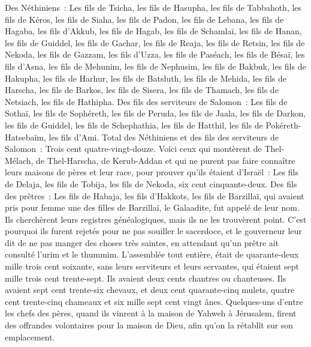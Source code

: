 \begin{multicols}{2}
Des Néthiniens~: Les fils de Tsicha, les fils de Hasupha, les fils de Tabbahoth,
les fils de Kéros, les fils de Siaha, les fils de Padon,
les fils de Lebana, les fils de Hagaba, les fils d'Akkub,
les fils de Hagab, les fils de Schamlaï, les fils de Hanan,
les fils de Guiddel, les fils de Gachar, les fils de Reaja,
les fils de Retsin, les fils de Nekoda, les fils de Gazzam,
les fils d'Uzza, les fils de Paséach, les fils de Bésaï,
les fils d'Asna, les fils de Mehunim, les fils de Nephusim,
les fils de Bakbuk, les fils de Hakupha, les fils de Harhur,
les fils de Batsluth, les fils de Mehida, les fils de Harscha,
les fils de Barkos, les fils de Sisera, les fils de Thamach,
les fils de Netsiach, les fils de Hathipha.
Des fils des serviteurs de Salomon~: Les fils de Sothaï, les fils de Sophéreth, les fils de Peruda,
les fils de Jaala, les fils de Darkon, les fils de Guiddel,
les fils de Schephathia, les fils de Hatthil, les fils de Pokéreth-Hatsebaïm, les fils d'Ami.
Total des Néthiniens et des fils des serviteurs de Salomon~: Trois cent quatre-vingt-douze.
Voici ceux qui montèrent de Thel-Mélach, de Thel-Harscha, de Kerub-Addan et qui ne purent pas faire connaître leurs maisons de pères et leur race, pour prouver qu'ils étaient d'Israël~:
Les fils de Delaja, les fils de Tobija, les fils de Nekoda, six cent cinquante-deux.
Des fils des prêtres~: Les fils de Habaja, les fils d'Hakkots, les fils de Barzillaï, qui avaient pris pour femme une des filles de Barzillaï, le Galaadite, fut appelé de leur nom.
Ils cherchèrent leurs registres généalogiques, mais ils ne les trouvèrent point. C'est pourquoi ils furent rejetés pour ne pas souiller le sacerdoce,
et le gouverneur leur dit de ne pas manger des choses très saintes, en attendant qu'un prêtre ait consulté l'urim et le thummim.
L'assemblée tout entière, était de quarante-deux mille trois cent soixante,
sans leurs serviteurs et leurs servantes, qui étaient sept mille trois cent trente-sept. Ils avaient deux cents chantres ou chanteuses.
Ils avaient sept cent trente-six chevaux, et deux cent quarante-cinq mulets,
quatre cent trente-cinq chameaux et six mille sept cent vingt ânes.
Quelques-uns d'entre les chefs des pères, quand ils vinrent à la maison de Yahweh à Jérusalem, firent des offrandes volontaires pour la maison de Dieu, afin qu'on la rétablît sur son emplacement.

\end{multicols}
